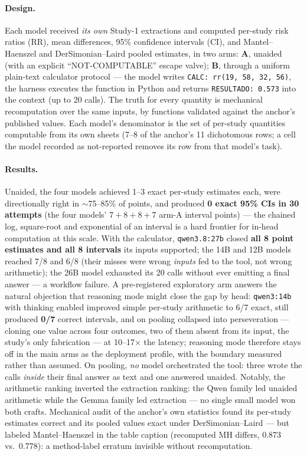 \documentclass[11pt]{article}
\begin{document}
\paragraph{Design.} Each model received \emph{its own} Study-1 extractions and computed per-study risk ratios (RR), mean differences, 95\% confidence intervals (CI), and Mantel--Haenszel and DerSimonian--Laird \citep{dersimonian1986meta} pooled estimates, in two arms: \textbf{A}, unaided (with an explicit ``NOT-COMPUTABLE'' escape valve); \textbf{B}, through a uniform plain-text calculator protocol --- the model writes \texttt{CALC: rr(19, 58, 32, 56)}, the harness executes the function in Python and returns \texttt{RESULTADO: 0.573} into the context (up to 20 calls). The truth for every quantity is mechanical recomputation over the same inputs, by functions validated against the anchor's published values. Each model's denominator is the set of per-study quantities computable from its own sheets (7--8 of the anchor's 11 dichotomous rows; a cell the model recorded as not-reported removes its row from that model's task).

\paragraph{Results.} Unaided, the four models achieved 1--3 exact per-study estimates each, were directionally right in $\sim$75--85\% of points, and produced \textbf{0 exact 95\% CIs in 30 attempts} (the four models' $7{+}8{+}8{+}7$ arm-A interval points) --- the chained log, square-root and exponential of an interval is a hard frontier for in-head computation at this scale. With the calculator, \texttt{qwen3.8:27b} closed \textbf{all 8 point estimates and all 8 intervals} its inputs supported; the 14B and 12B models reached 7/8 and 6/8 (their misses were wrong \emph{inputs} fed to the tool, not wrong arithmetic); the 26B model exhausted its 20 calls without ever emitting a final answer --- a workflow failure. A pre-registered exploratory arm answers the natural objection that reasoning mode might close the gap by head: \texttt{qwen3:14b} with thinking enabled improved simple per-study arithmetic to 6/7 exact, still produced \textbf{0/7} correct intervals, and on pooling collapsed into perseveration --- cloning one value across four outcomes, two of them absent from its input, the study's only fabrication --- at 10--17$\times$ the latency; reasoning mode therefore stays off in the main arms as the deployment profile, with the boundary measured rather than assumed. On pooling, \emph{no} model orchestrated the tool: three wrote the calls \emph{inside} their final answer as text and one answered unaided. Notably, the arithmetic ranking inverted the extraction ranking: the Qwen family led unaided arithmetic while the Gemma family led extraction --- no single small model won both crafts. Mechanical audit of the anchor's own statistics found its per-study estimates correct and its pooled values exact under DerSimonian--Laird --- but labeled Mantel--Haenszel in the table caption (recomputed MH differs, 0.873 vs.\ 0.778): a method-label erratum invisible without recomputation.
\end{document}
